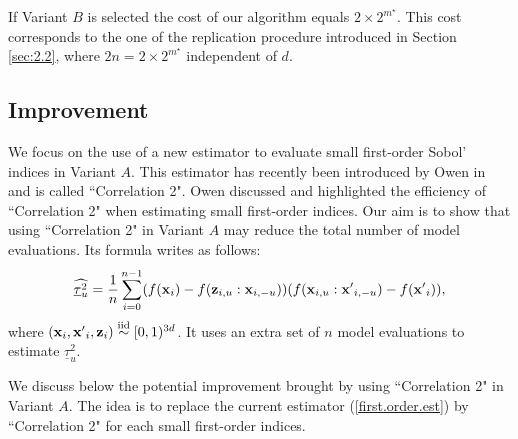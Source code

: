If Variant $B$ is selected the cost of our algorithm equals $2 \times 2^{m^{\star}}$. This cost corresponds to the one of the replication procedure introduced in Section \ref{sec:2.2}, where $2n=2\times 2^{m^{\star}}$ independent of $d$.

\subsection{Improvement}
\label{sec:4.2}

We focus on the use of a new estimator to evaluate small first-order Sobol' indices in Variant $A$. This estimator has recently been introduced by Owen in \cite{Owen} and is called ``Correlation 2". Owen discussed and highlighted the efficiency of ``Correlation 2" when estimating small first-order indices. Our aim is to show that using ``Correlation 2" in Variant $A$ may reduce the total number of model evaluations. Its formula writes as follows:
\begin{equation*}
\widehat{\underline{\tau}_u^2} = \frac{1}{n} \sum \limits_{i=0}^{n-1} (f(\boldsymbol{\mathbf{x}}_i)-f({\boldsymbol{\mathbf{z}}}_{i,u}:{\boldsymbol{\mathbf{x}}}_{i,-u}))(f(\boldsymbol{\mathbf{x}}_{i,u}:{\boldsymbol{\mathbf{x}}'}_{i,-u})-f({\boldsymbol{\mathbf{x}}'}_i)),
\end{equation*}
where $(\boldsymbol{\mathbf{x}}_i,{\boldsymbol{\mathbf{x}}'}_i, \boldsymbol{\mathbf{z}}_i) \stackrel{{\rm iid}}{\sim} [0,1)^{3d}$. It uses an extra set of $n$ model evaluations to estimate $\underline{\tau}_u^2$.
\bigskip

We discuss below the potential improvement brought by using ``Correlation 2" in Variant $A$. The idea is to replace the current estimator (\ref{first.order.est}) by  ``Correlation 2" for each small first-order indices. 

